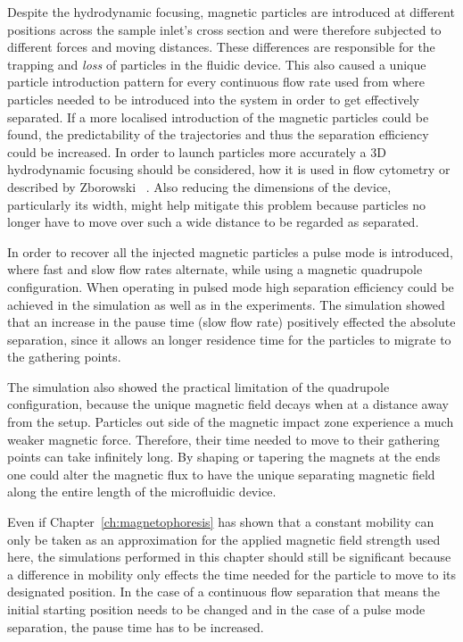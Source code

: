 Despite the hydrodynamic focusing, magnetic particles are introduced at different positions across the sample inlet's cross section and were therefore subjected to different forces and moving distances. These differences are responsible for the trapping and \textit{loss} of particles in the fluidic device. This also caused a unique particle introduction pattern for every continuous flow rate used from where particles needed to be introduced into the system in order to get effectively separated. If a more localised introduction of the magnetic particles could be found, the predictability of the trajectories and thus the separation efficiency could be increased. In order to launch particles more accurately a 3D hydrodynamic focusing should be considered, how it is used in flow cytometry or described by Zborowski \etal~\cite{Zborowski2011a}. Also reducing the dimensions of the device, particularly its width, might help mitigate this problem because particles no longer have to move over such a wide distance to be regarded as separated.

In order to recover all the injected magnetic particles a pulse mode is introduced, where fast and slow flow rates alternate, while using a magnetic quadrupole configuration. When operating in pulsed mode high separation efficiency could be achieved in the simulation as well as in the experiments. The simulation showed that an increase in the pause time (slow flow rate) positively effected the absolute separation, since it allows an longer residence time for the particles to migrate to the gathering points. 

The simulation also showed the practical limitation of the quadrupole configuration, because the unique magnetic field decays when at a distance away from the setup. Particles out side of the magnetic impact zone experience a much weaker magnetic force. Therefore, their time needed to move to their gathering points can take infinitely long. By shaping or tapering the magnets at the ends one could alter the magnetic flux to have the unique separating magnetic field along the entire length of the microfluidic device.  

Even if Chapter~\ref{ch:magnetophoresis} has shown that a constant mobility can only be taken as an approximation for the applied magnetic field strength used here, the simulations performed in this chapter should still be significant because a difference in mobility only effects the time needed for the particle to move to its designated position. In the case of a continuous flow separation that means the initial starting position needs to be changed and in the case of a pulse mode separation, the pause time has to be increased. 

